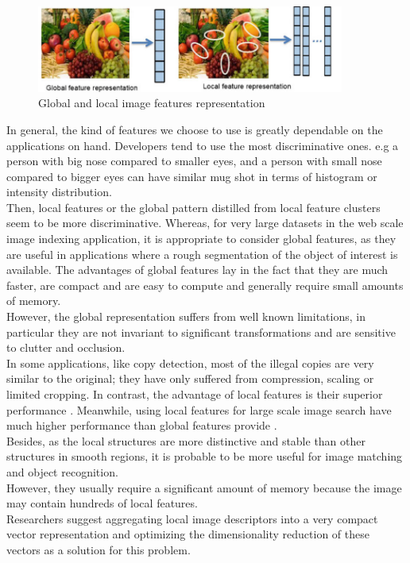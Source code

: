 \begin{figure}[H]
\centering
\includegraphics[width=0.9\textwidth]{img/features.PNG}
\caption{ Global and local image features representation }
\label{fig:Ft1}
\end{figure}

In general, the kind of features we choose to use is greatly dependable on the applications on hand. Developers tend to use the most discriminative ones. e.g a person with big nose compared to smaller eyes, and a person with small nose compared to bigger eyes can have similar mug shot in terms of histogram or intensity distribution.\\


Then, local features or the global pattern distilled from local feature clusters seem to be more discriminative. Whereas, for very large datasets in the web scale image indexing application, it is appropriate to consider global features, as they are useful in applications where a rough segmentation of the object of interest is available.
The advantages of global features lay in the fact that they are much faster, are compact and are easy to compute and generally require small amounts of memory.\\ However, the global representation suffers from well known limitations, in particular they are not invariant to significant transformations and are sensitive to clutter and occlusion.\\In some applications, like copy detection, most of the illegal copies are very  similar to the original; they have only suffered from compression, scaling or limited
cropping. In contrast, the advantage of local features is their superior performance \cite{i}. Meanwhile, using local features for large scale image search have much higher performance than global features provide \cite{k}.\\ Besides, as the local structures are more distinctive and stable than other structures in smooth regions, it is probable to be more useful for image matching and object recognition.\\ However, they usually require a significant amount of memory because the image may contain hundreds of local features.\\ Researchers suggest aggregating local image descriptors into a very compact vector representation and optimizing the
dimensionality reduction of these vectors as a solution for this problem. \cite{k}



